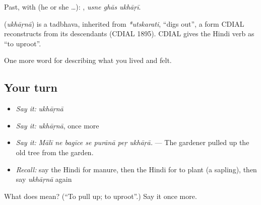 Past, with  (he or she …):   , \emph{usne ghās ukhāṛī}.

\begin{cousinweb}
\textbf{} (\emph{ukhāṛnā}) is a tadbhava, inherited from \emph{*utskarati}, \textquotedblleft{}digs out\textquotedblright{}, a form CDIAL reconstructs from its descendants (CDIAL 1895). CDIAL gives the Hindi verb as \textquotedblleft{}to uproot\textquotedblright{}.
\end{cousinweb}

\begin{grammarlens}[title={What you've built}]
One more word for describing what you lived and felt.
\end{grammarlens}

\subsection*{Your turn}
\begin{itemize}
\raggedright
  \item \emph{Say it:} \emph{ukhāṛnā}
  \item \emph{Say it:} \emph{ukhāṛnā}, once more
  \item \emph{Say it:} \emph{Mālī ne bagīce se purānā peṛ ukhāṛā.} — The gardener pulled up the old tree from the garden.
  \item \emph{Recall:} say the Hindi for manure, then the Hindi for to plant (a sapling), then say \emph{ukhāṛnā} again
\end{itemize}

\begin{tcolorbox}[breakable,colback=teal!4,colframe=teal!35!black,title={Before you move on}]
What does  mean? (\textquotedblleft{}To pull up; to uproot\textquotedblright{}.) Say it once more.
\end{tcolorbox}
